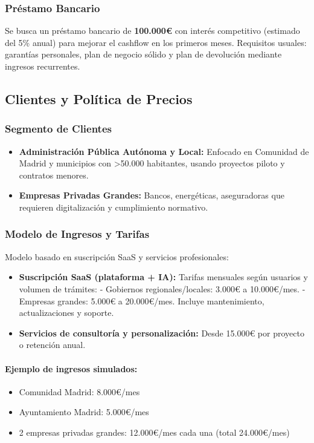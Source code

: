 \subsubsection{Préstamo Bancario}

Se busca un préstamo bancario de \textbf{100.000€} con interés competitivo (estimado del 5\% anual) para mejorar el cashflow en los primeros meses.  
Requisitos usuales: garantías personales, plan de negocio sólido y plan de devolución mediante ingresos recurrentes.

\subsection{Clientes y Política de Precios}

\subsubsection{Segmento de Clientes}

\begin{itemize}
  \item \textbf{Administración Pública Autónoma y Local:} Enfocado en Comunidad de Madrid y municipios con >50.000 habitantes, usando proyectos piloto y contratos menores.
  \item \textbf{Empresas Privadas Grandes:} Bancos, energéticas, aseguradoras que requieren digitalización y cumplimiento normativo.
\end{itemize}

\subsubsection{Modelo de Ingresos y Tarifas}

Modelo basado en suscripción SaaS y servicios profesionales:

\begin{itemize}
  \item \textbf{Suscripción SaaS (plataforma + IA):}  
  Tarifas mensuales según usuarios y volumen de trámites:  
  - Gobiernos regionales/locales: 3.000€ a 10.000€/mes.  
  - Empresas grandes: 5.000€ a 20.000€/mes.  
  Incluye mantenimiento, actualizaciones y soporte.
  
  \item \textbf{Servicios de consultoría y personalización:}  
  Desde 15.000€ por proyecto o retención anual.
\end{itemize}

\paragraph{Ejemplo de ingresos simulados:}
\begin{itemize}
  \item Comunidad Madrid: 8.000€/mes
  \item Ayuntamiento Madrid: 5.000€/mes
  \item 2 empresas privadas grandes: 12.000€/mes cada una (total 24.000€/mes)
\end{itemize}

